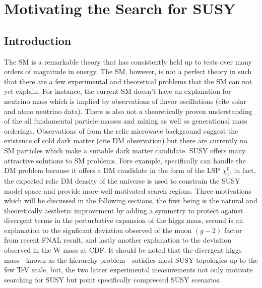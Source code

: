 
\setcounter{secnumdepth}{3}
\setcounter{tocdepth}{3}

\setlength{\parindent}{1 em}


\makeatother


\chapter{Motivating the Search for SUSY}


\section{Introduction}

The SM is a remarkable theory that has consistently held up to tests over many orders of magnitude in energy. The SM, however, is not a perfect theory in such that there are a few  experimental and theoretical problems that the SM can not yet explain. For instance, the current SM doesn't have an explanation for neutrino mass which is implied by observations of flavor oscillations (cite solar and atmo neutrino data). There is also not a theoretically proven understanding of the all fundamental particle masses and mixing as well as generational mass orderings. Observations of from the relic microwave background suggest the existence of cold dark matter (cite DM observation) but there are currently no SM particles which make a suitable dark matter candidate. SUSY offers many attractive solutions to SM problems. Fore example, specifically can handle the DM problem because it offers a DM candidate in the form of the LSP $\chi_1^0$, in fact, the expected relic DM density of the universe is used to constrain the SUSY model space and provide more well motivated search regions. Three motivations which will be discussed in the following sections, the first being is the  natural and theoretically aesthetic improvement by adding a symmetry to protect against divergent terms in the perturbative expansion of the higgs mass, second is an explanation to the signficant deviation observed of the muon $(g-2)$ factor from recent FNAL result, and lastly another explanation to the deviation observed in the W mass at CDF. It should be noted that the divergent higgs mass - known as the hierarchy problem - satisfies most SUSY topologies up to the few TeV scale, but, the two latter experimental measurements not only motivate searching for SUSY but point specifically compressed SUSY scenarios.



